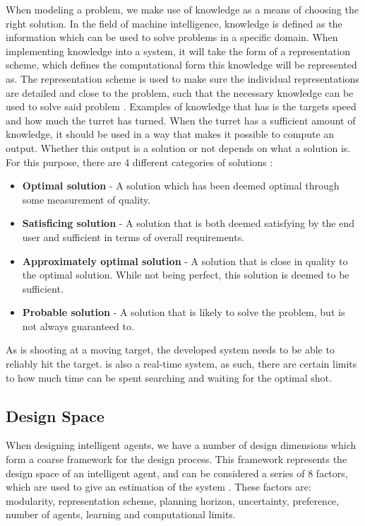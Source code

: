 When modeling a problem, we make use of knowledge as a means of choosing the
right solution. In the field of machine intelligence, knowledge is defined as
the information which can be used to solve problems in a specific domain. When
implementing knowledge into a system, it will take the form of a representation
scheme, which defines the computational form this knowledge will be represented
as. The representation scheme is used to make sure the individual
representations are detailed and close to the problem, such that the necessary
knowledge can be used to solve said problem \citep[ch.1.4]{MIBook}.
Examples of knowledge that \name has is the targets speed and how much the
turret has turned. When the turret has a sufficient amount of knowledge, it
should be used in a way that makes it possible to compute an output. Whether
this output is a solution or not depends on what a solution is. For this
purpose, there are 4 different categories of solutions \citep[ch.1.4.1]{MIBook}:

\begin{itemize}
  \item \textbf{Optimal solution} - A solution which has been deemed optimal
  through some measurement of quality.
  \item \textbf{Satisficing solution} - A solution that is both deemed
  satisfying by the end user and sufficient in terms of overall requirements. 
  \item \textbf{Approximately optimal solution} - A solution that is close in
  quality to the optimal solution. While not being perfect, this solution is
  deemed to be sufficient.
  \item \textbf{Probable solution} - A solution that is likely to solve the
  problem, but is not always guaranteed to.
\end{itemize}


As \name is shooting at a moving target, the developed system needs to be able
to reliably hit the target. \name is also a real-time system, as such, there
are certain limits to how much time can be spent searching and waiting for the
optimal shot.

\subsection{Design Space}
When designing intelligent agents, we have a number of design dimensions which
form a coarse framework for the design process. This framework represents the
design space of an intelligent agent, and can be considered a series of 8
factors, which are used to give an estimation of the system
\citep[ch.1.5]{MIBook}. These factors are: modularity, representation scheme,
planning horizon, uncertainty, preference, number of agents, learning and
computational limits.

